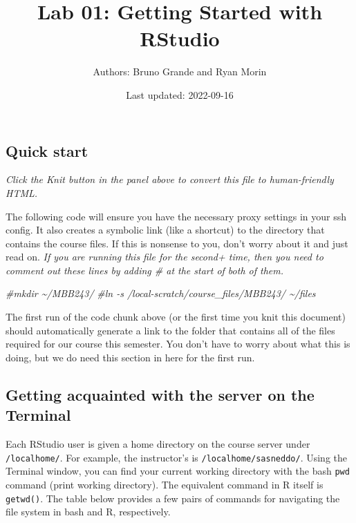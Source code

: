 \documentclass[
]{article}
\title{Lab 01: Getting Started with RStudio}
\author{Authors: Bruno Grande and Ryan Morin}
\date{Last updated: 2022-09-16}
\newenvironment{Shaded}{\begin{snugshade}}{\end{snugshade}}
\newcommand{\CommentTok}[1]{\textcolor[rgb]{0.56,0.35,0.01}{\textit{#1}}}
\begin{document}
\maketitle

\hypertarget{quick-start}{%
\subsection{Quick start}\label{quick-start}}

\emph{Click the Knit button in the panel above to convert this file to
human-friendly HTML.}

The following code will ensure you have the necessary proxy settings in
your ssh config. It also creates a symbolic link (like a shortcut) to
the directory that contains the course files. If this is nonsense to
you, don't worry about it and just read on. \emph{If you are running
this file for the second+ time, then you need to comment out these lines
by adding \# at the start of both of them.}

\begin{Shaded}
\begin{Highlighting}[]
\CommentTok{\#mkdir \textasciitilde{}/MBB243/}
\CommentTok{\#ln {-}s /local{-}scratch/course\_files/MBB243/ \textasciitilde{}/files}
\end{Highlighting}
\end{Shaded}

The first run of the code chunk above (or the first time you knit this
document) should automatically generate a link to the folder that
contains all of the files required for our course this semester. You
don't have to worry about what this is doing, but we do need this
section in here for the first run.

\hypertarget{getting-acquainted-with-the-server-on-the-terminal}{%
\subsection{Getting acquainted with the server on the
Terminal}\label{getting-acquainted-with-the-server-on-the-terminal}}

Each RStudio user is given a home directory on the course server under
\texttt{/localhome/}. For example, the instructor's is
\texttt{/localhome/sasneddo/}. Using the Terminal window, you can find
your current working directory with the bash \texttt{pwd} command (print
working directory). The equivalent command in R itself is
\texttt{getwd()}. The table below provides a few pairs of commands for
navigating the file system in bash and R, respectively.
\end{document}
